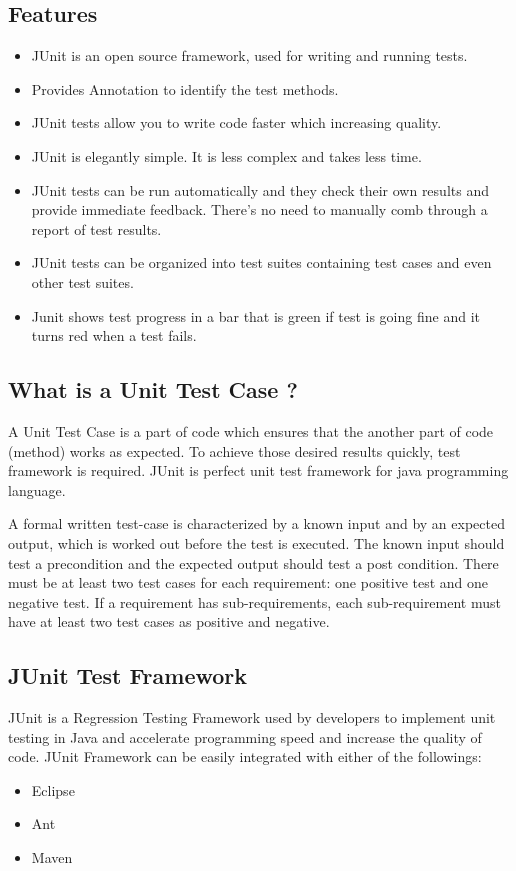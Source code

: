 \documentclass[11pt,a4paper]{article}
\begin{document}
\subsection*{Features}
\begin{itemize}
\item JUnit is an open source framework, used for writing and running tests.
\item Provides Annotation to identify the test methods.
\item JUnit tests allow you to write code faster which increasing quality.
\item JUnit is elegantly simple. It is less complex and takes less time.
\item JUnit tests can be run automatically and they check their own results and provide immediate feedback. There's no need to manually comb through a report of test results.
\item JUnit tests can be organized into test suites containing test cases and even other test suites.
\item Junit shows test progress in a bar that is green if test is going fine and it turns red when a test fails.
\end{itemize}

\subsection*{What is a Unit Test Case ?}
A Unit Test Case is a part of code which ensures that the another part of code (method) works as expected. To achieve those desired results quickly, test framework is required. JUnit is perfect unit test framework for java programming language.

A formal written test-case is characterized by a known input and by an expected output, which is worked out before the test is executed. The known input should test a precondition and the expected output should test a post condition.
There must be at least two test cases for each requirement: one positive test and one negative test. If a requirement has sub-requirements, each sub-requirement must have at least two test cases as positive and negative.

\subsection*{JUnit Test Framework}
JUnit is a Regression Testing Framework used by developers to implement unit testing in Java and accelerate programming speed and increase the quality of code. JUnit Framework can be easily integrated with either of the followings:
\begin{itemize}
\item Eclipse
\item Ant
\item Maven
\end{itemize}
\end{document}
